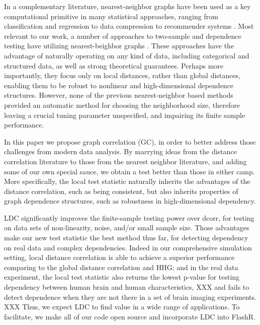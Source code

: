 \documentclass[12pt]{article}
\begin{document}
In a complementary literature, nearest-neighbor graphs have been used as a key computational primitive in many statistical approaches, ranging from classification and regression \cite{Stone1970} to data compression to recommender systems \cite{Sarwar2000}. Most relevant to our work, a number of approaches to two-sample and dependence testing have utilizing nearest-beighbor graphs \cite{David1962,Friedman1983,Schilling1986,Dumcke2014}.  These approaches have the advantage of naturally operating on any kind of data, including categorical and structured data, as well as strong theoretical guarantees.  Perhaps more importantly, they focus only on local distances, rather than global distances, enabling them to be robust to nonlinear and high-dimensional dependence structures.  However, none of the previous nearest-neighbor based methods provided an automatic method for choosing the neighborhood size, therefore leaving a crucial tuning parameter unspecified, and impairing its finite sample performance.


In this paper we propose graph correlation (GC), in order to better address those challenges from modern data analysis. By marrying ideas from the distance correlation literature to those from the nearest neighbor literature, and adding some of our own special sauce, we obtain a test better than those in either camp.  More specifically,  the local test statistic naturally inherits the advantages of the  distance correlation, such as being consistent, but also inherits properties of graph dependence structures, such as robustness in high-dimensional dependency.  

LDC significantly improves the finite-sample testing power over dcorr, for testing on data sets of non-linearity, noise, and/or small sample size. Those advantages make our new test statistic the best method thus far, for detecting dependency on real data and complex dependencies. Indeed in our comprehensive simulation setting, local distance correlation is able to achieve a superior performance comparing to the global distance correlation and HHG; and in the real data experiment, the local test statistic also returns the lowest p-value for testing dependency between human brain and human characteristics, XXX and fails to detect dependence when they are not there in a set of brain imaging experiments. XXX  Thus, we expect LDC to find value in a wide range of applications.  To facilitate, we make all of our code open source and incorporate LDC into FlashR.
\end{document}
